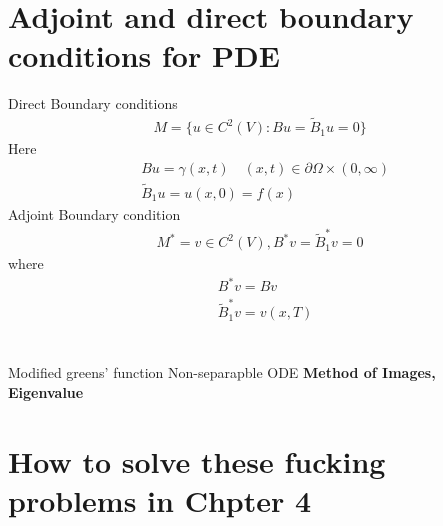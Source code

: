 \documentclass{article}
\numberwithin{equation}{section}
\newcommand{\<}{\langle}
\begin{document}
\section{Adjoint and direct boundary conditions for PDE}
Direct Boundary conditions
\begin{align}
	M = \{u \in C^2 (V): Bu = \tilde{B}_1u=0\}
\end{align}
Here
\begin{align}
	&Bu = \gamma(x,t) \quad (x,t) \in \partial \Omega\times (0,\infty)\\
	&\tilde{B}_1u = u(x,0) = f(x)
\end{align}
Adjoint Boundary condition
\begin{align}
	M^* = {v\in C^2(V),B^*v = \tilde{B}^*_1 v = 0}
\end{align}
where 
\begin{align}
	&B^*v = Bv\\
	&\tilde{B}_1^*v = v(x,T)
\end{align}
\section*{}
Modified greens' function
Non-separapble ODE
\textbf{Method of Images, Eigenvalue}
\section{How to solve these fucking problems in Chpter 4}
\end{document}

